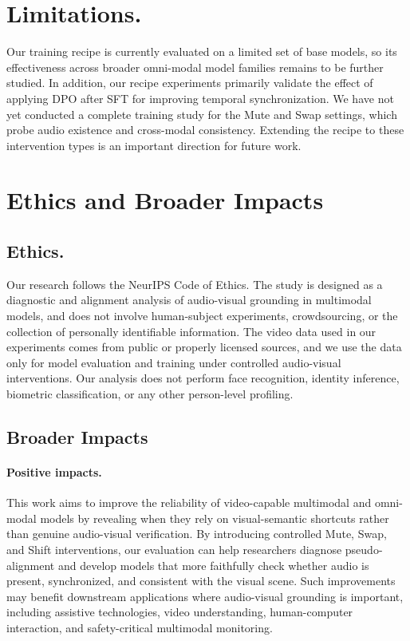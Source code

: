 \section{Limitations.}
\label{app:limit}
Our training recipe is currently evaluated on a limited set of base models, so its effectiveness across broader omni-modal model families remains to be further studied. In addition, our recipe experiments primarily validate the effect of applying DPO after SFT for improving temporal synchronization. We have not yet conducted a complete training study for the Mute and Swap settings, which probe audio existence and cross-modal consistency. Extending the recipe to these intervention types is an important direction for future work.

\section{Ethics and Broader Impacts}
\label{app:ethics-impact}

\subsection{Ethics.}
Our research follows the NeurIPS Code of Ethics. The study is designed as a diagnostic and alignment analysis of audio-visual grounding in multimodal models, and does not involve human-subject experiments, crowdsourcing, or the collection of personally identifiable information. The video data used in our experiments comes from public or properly licensed sources, and we use the data only for model evaluation and training under controlled audio-visual interventions. Our analysis does not perform face recognition, identity inference, biometric classification, or any other person-level profiling.

\subsection{Broader Impacts}
\paragraph{Positive impacts.}
This work aims to improve the reliability of video-capable multimodal and omni-modal models by revealing when they rely on visual-semantic shortcuts rather than genuine audio-visual verification. By introducing controlled Mute, Swap, and Shift interventions, our evaluation can help researchers diagnose pseudo-alignment and develop models that more faithfully check whether audio is present, synchronized, and consistent with the visual scene. Such improvements may benefit downstream applications where audio-visual grounding is important, including assistive technologies, video understanding, human-computer interaction, and safety-critical multimodal monitoring.

